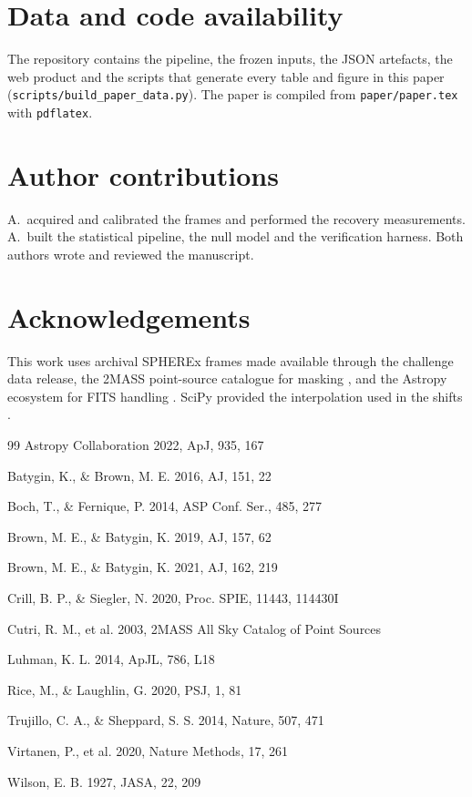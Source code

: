 \documentclass[11pt,a4paper]{article}
\newcommand{\code}[1]{\texttt{#1}}
\begin{document}
\section*{Data and code availability}
The repository contains the pipeline, the frozen inputs, the JSON artefacts, the
web product and the scripts that generate every table and figure in this paper
(\code{scripts/build\_paper\_data.py}). The paper is compiled from
\code{paper/paper.tex} with \code{pdflatex}.

\section*{Author contributions}
A.\ acquired and calibrated the frames and performed the recovery measurements.
A.\ built the statistical pipeline, the null model and the verification harness.
Both authors wrote and reviewed the manuscript.

\section*{Acknowledgements}
This work uses archival SPHEREx frames made available through the challenge data
release, the 2MASS point-source catalogue for masking \citep{cutri2003}, and the
Astropy ecosystem for FITS handling \citep{astropy2022}. SciPy provided the
interpolation used in the shifts \citep{virtanen2020}.

\begin{thebibliography}{99}
\small
{}
Astropy Collaboration 2022, ApJ, 935, 167

Batygin, K., \& Brown, M. E. 2016, AJ, 151, 22

Boch, T., \& Fernique, P. 2014, ASP Conf. Ser., 485, 277

Brown, M. E., \& Batygin, K. 2019, AJ, 157, 62

Brown, M. E., \& Batygin, K. 2021, AJ, 162, 219

Crill, B. P., \& Siegler, N. 2020, Proc. SPIE, 11443, 114430I

Cutri, R. M., et al. 2003, 2MASS All Sky Catalog of Point Sources

Luhman, K. L. 2014, ApJL, 786, L18

Rice, M., \& Laughlin, G. 2020, PSJ, 1, 81

Trujillo, C. A., \& Sheppard, S. S. 2014, Nature, 507, 471

Virtanen, P., et al. 2020, Nature Methods, 17, 261

Wilson, E. B. 1927, JASA, 22, 209
\end{thebibliography}
\end{document}
